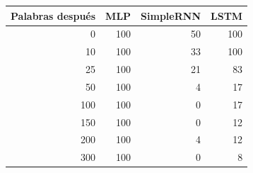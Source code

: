 \begin{tabular}{rrrr}
\toprule
\textbf{Palabras después} & \textbf{MLP} & \textbf{SimpleRNN} & \textbf{LSTM} \\
\midrule
0 & 100 & 50 & 100 \\
10 & 100 & 33 & 100 \\
25 & 100 & 21 & 83 \\
50 & 100 & 4 & 17 \\
100 & 100 & 0 & 17 \\
150 & 100 & 0 & 12 \\
200 & 100 & 4 & 12 \\
300 & 100 & 0 & 8 \\
\bottomrule
\end{tabular}
